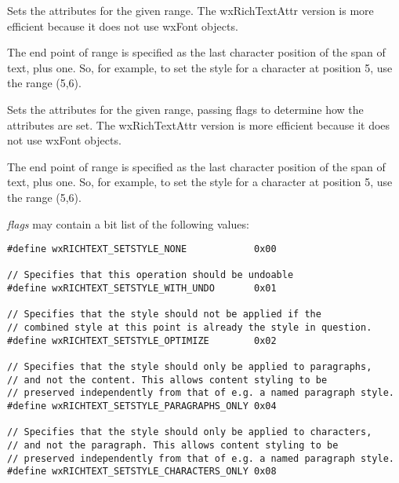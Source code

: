 \label{wxrichtextctrlsetstyle}




Sets the attributes for the given range. The wxRichTextAttr version is more efficient
because it does not use wxFont objects.

The end point of range is specified as the last character position of the span of text, plus one.
So, for example, to set the style for a character at position 5, use the range (5,6).

\label{wxrichtextctrlsetstyleex}




Sets the attributes for the given range, passing flags to determine how the attributes are set. The wxRichTextAttr version is more efficient
because it does not use wxFont objects.

The end point of range is specified as the last character position of the span of text, plus one.
So, for example, to set the style for a character at position 5, use the range (5,6).

{\it flags} may contain a bit list of the following values:

\begin{verbatim}
#define wxRICHTEXT_SETSTYLE_NONE            0x00

// Specifies that this operation should be undoable
#define wxRICHTEXT_SETSTYLE_WITH_UNDO       0x01

// Specifies that the style should not be applied if the
// combined style at this point is already the style in question.
#define wxRICHTEXT_SETSTYLE_OPTIMIZE        0x02

// Specifies that the style should only be applied to paragraphs,
// and not the content. This allows content styling to be
// preserved independently from that of e.g. a named paragraph style.
#define wxRICHTEXT_SETSTYLE_PARAGRAPHS_ONLY 0x04

// Specifies that the style should only be applied to characters,
// and not the paragraph. This allows content styling to be
// preserved independently from that of e.g. a named paragraph style.
#define wxRICHTEXT_SETSTYLE_CHARACTERS_ONLY 0x08
\end{verbatim}


